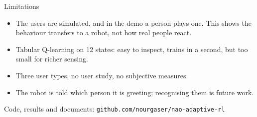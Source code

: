 \documentclass[aspectratio=169,10pt]{beamer}
\begin{document}
\begin{frame}{Limitations}
\begin{itemize}
  \item The users are simulated, and in the demo a person plays one. This shows
        the behaviour transfers to a robot, not how real people react.
  \item Tabular Q-learning on 12 states: easy to inspect, trains in a second,
        but too small for richer sensing.
  \item Three user types, no user study, no subjective measures.
  \item The robot is told which person it is greeting; recognising them is
        future work.
\end{itemize}

\bigskip
\centering
Code, results and documents: \texttt{github.com/nourgaser/nao-adaptive-rl}
\end{frame}
\end{document}
